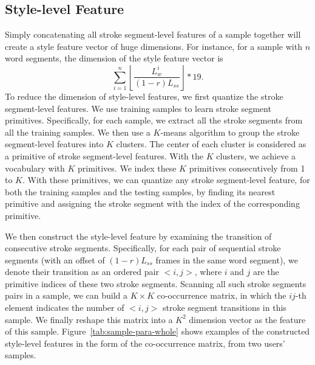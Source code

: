 \subsection{Style-level Feature}

Simply concatenating all stroke segment-level features of a sample together will create a style feature vector of huge dimensions. For instance, for a sample with $n$ word segments, the dimension of the style feature vector is
$$\sum^n_{i=1} \left \lfloor \frac{L^i_w}{(1-r)L_{ss}}\right \rfloor * 19. $$ 
%
To reduce the dimension of style-level features, we first quantize the stroke segment-level features.
We use training samples to learn stroke segment primitives. Specifically, for each sample, we extract all the stroke segments from all the training samples. %
We then use a $K$-means algorithm to group the stroke segment-level features into $K$ clusters.
The center of each cluster is considered as a primitive of stroke segment-level features. With the $K$ clusters, we achieve a vocabulary with $K$ primitives.
We index these $K$ primitives consecutively from 1 to $K$. With these primitives, we can quantize any stroke segment-level feature, for both the training samples and the testing samples, by finding its nearest primitive and assigning the stroke segment with the index of the corresponding primitive.

We then construct the style-level feature by examining the transition of consecutive stroke segments.  Specifically,
for each pair of sequential stroke segments (with an offset of $(1-r)L_{ss}$ frames in the same word segment), we denote their transition
as an ordered pair $<i,j>$, where $i$ and $j$ are the primitive indices of these two stroke segments. Scanning all such stroke segments pairs
in a sample, we can build a $K\times K$ co-occurrence matrix, in which the $ij$-th element indicates the number of
$<i,j>$ stroke segment transitions in this sample. We finally reshape this matrix into a $K^2$ dimension vector as the feature of this sample.
Figure~\ref{tab:sample-para-whole} shows examples of the constructed style-level features in the form of the co-occurrence matrix, from two users' samples.  




